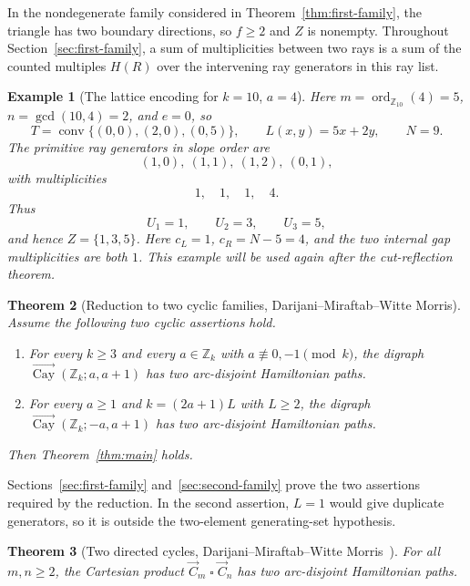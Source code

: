 \documentclass[11pt]{article}
\newtheorem{theorem}{Theorem}[section]
\newtheorem{example}[theorem]{Example}
\newcommand{\Cay}{\overrightarrow{\operatorname{Cay}}}
\newcommand{\Z}{\mathbb Z}
\newcommand{\ord}{\operatorname{ord}}
\newcommand{\Boxprod}{\mathbin{\square}}
\begin{document}
In the nondegenerate family considered in Theorem~\ref{thm:first-family}, the triangle has two boundary directions, so $f\ge2$ and $Z$ is nonempty.  Throughout Section~\ref{sec:first-family}, a sum of multiplicities between two rays is a sum of the counted multiples $H(R)$ over the intervening ray generators in this ray list.

\begin{example}[The lattice encoding for $k=10$, $a=4$]\label{ex:lattice-10-4}
Here $m=\ord_{\Z_{10}}(4)=5$, $n=\gcd(10,4)=2$, and $e=0$, so
\[
        T=\operatorname{conv}\{(0,0),(2,0),(0,5)\},
        \qquad L(x,y)=5x+2y,
        \qquad N=9.
\]
The primitive ray generators in slope order are
\[
        (1,0),\ (1,1),\ (1,2),\ (0,1),
\]
with multiplicities
\[
        1,\quad 1,\quad 1,\quad 4.
\]
Thus
\[
        U_1=1,
        \qquad U_2=3,
        \qquad U_3=5,
\]
and hence $Z=\{1,3,5\}$.  Here $c_L=1$, $c_R=N-5=4$, and the two internal gap multiplicities are both $1$.  This example will be used again after the cut-reflection theorem.
\end{example}

\begin{theorem}[Reduction to two cyclic families, Darijani--Miraftab--Witte Morris]\label{input:reduction}
Assume the following two cyclic assertions hold.
\begin{enumerate}[label=(\roman*)]
\item For every $k\ge3$ and every $a\in\Z_k$ with $a\not\equiv0,-1\pmod{k}$, the digraph $\Cay(\Z_k;a,a+1)$ has two arc-disjoint Hamiltonian paths.
\item For every $a\ge1$ and $k=(2a+1)L$ with $L\ge2$, the digraph $\Cay(\Z_k;-a,a+1)$ has two arc-disjoint Hamiltonian paths.
\end{enumerate}
Then Theorem~\ref{thm:main} holds.
\end{theorem}

Sections~\ref{sec:first-family} and~\ref{sec:second-family} prove the two assertions required by the reduction.  In the second assertion, $L=1$ would give duplicate generators, so it is outside the two-element generating-set hypothesis.

\begin{theorem}[Two directed cycles, Darijani--Miraftab--Witte Morris~{\cite[Theorem~4.4]{DMM}}]\label{input:twocycle-existence}
For all $m,n\ge2$, the Cartesian product $\vec C_m\Boxprod\vec C_n$ has two arc-disjoint Hamiltonian paths.
\end{theorem}
\end{document}
